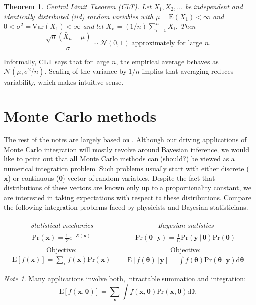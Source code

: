 \documentclass[11pt]{article}\usepackage[]{graphicx}\usepackage[]{color}
\numberwithin{algorithm}{section}
\newcommand{\cprob}[2]{\ensuremath{\text{Pr}\left(#1 \,|\,#2\right)}}
\newcommand{\prob}[1]{\ensuremath{\text{Pr}\left(#1 \right)}}
\newtheorem*{theorem}{Theorem}
\theoremstyle{remark}
\newtheorem*{mynote}{Note}
\theoremstyle{definition}
\begin{document}
\begin{theorem}{Central Limit Theorem (CLT).}
Let $X_1,X_2,\dots$ be independent and identically distributed (iid) random variables
with $\mu = \text{E}(X_1) < \infty$ and $0 < \sigma^2 = \text{Var}(X_1)  < \infty$ and let $\bar{X}_n = (1/n)\sum_{i=1}^n X_i$. Then
\[
\frac{\sqrt{n}(\bar{X}_n - \mu)}{\sigma} \sim \mathcal{N}(0,1) \text{ approximately for large } n.
\]
\end{theorem}
Informally, CLT says that for large $n$, the empirical average behaves as $\mathcal{N}(\mu, \sigma^2/n)$. Scaling of the variance by $1/n$ implies that averaging reduces
variability, which makes intuitive sense. 

\clearpage

\section{Monte Carlo methods}
The rest of the notes are largely based on \citep{RobertANDCasella}. Although our driving applications of 
Monte Carlo integration will mostly revolve around Bayesian inference, we would like to point out that
all Monte Carlo methods can (should?) be viewed as a numerical integration problem. 
Such problems usually start with either discrete ($\mathbf{x}$) or continuous ($\boldsymbol{\theta}$) 
vector of random variables. Despite the fact that distributions of these vectors are known only 
up to a proportionality constant, we are interested in taking expectations with respect to these distributions.
Compare the following integration problems faced by physicists and Bayesian statisticians.
\begin{center}
  \begin{tabular*}{0.9\textwidth}{@{\extracolsep{\fill}}cc}
    \textit{Statistical mechanics} & \textit{Bayesian statistics} \\  
      $\displaystyle \prob{\mathbf{x}} = \frac{1}{Z} e^{-\mathcal{E}(\mathbf{x})}$ &
      $\displaystyle \cprob{\boldsymbol{\theta}}{\mathbf{y}} = \frac{1}{C} \cprob{\mathbf{y}}{\boldsymbol{\theta}}
      \prob{\boldsymbol{\theta}}$ \\
      Objective: $\text{E}[f(\mathbf{x})] = \sum_{\mathbf{x}} f(\mathbf{x})\prob{\mathbf{x}}$ &
      Objective: $\text{E}[f(\mathbf{\boldsymbol{\theta}})\,|\,\mathbf{y}] = 
      \int f(\boldsymbol{\theta})\cprob{\boldsymbol{\theta}}{\mathbf{y}}\text{d}\boldsymbol{\theta}$
  \end{tabular*}
\end{center}
\begin{mynote}
  Many applications involve both, intractable summation and integration:
  \begin{equation*}
    \text{E}[f(\mathbf{x},\boldsymbol{\theta})] = 
    \sum_{\mathbf{x}}\int f(\boldsymbol{\mathbf{x},\theta})\prob{\mathbf{x},\boldsymbol{\theta}}
    \text{d}\boldsymbol{\theta}.
  \end{equation*}
\end{mynote}
\end{document}
